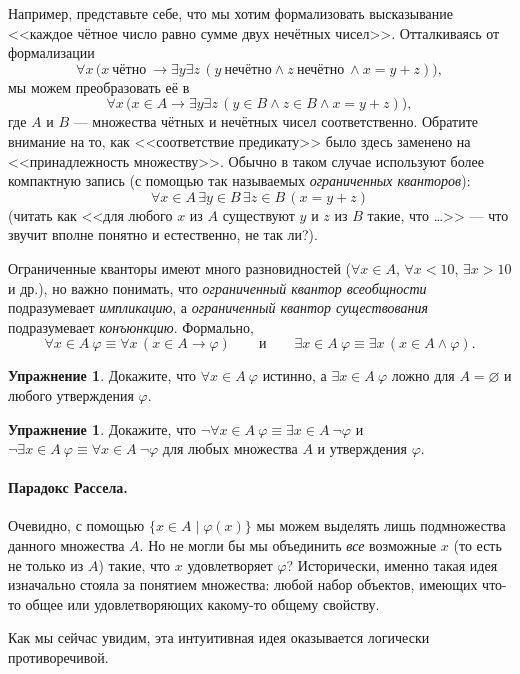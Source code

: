 \documentclass[12pt,notitlepage]{article}
\theoremstyle{plain}
\theoremstyle{definition}
\newtheorem{exc}[thm]{Упражнение}
\theoremstyle{plain}
\newcommand{\void}{\varnothing}
\renewcommand{\phi}{\varphi}
\newcommand{\1}{\mathbf{1}}
\newcommand{\0}{\mathbf{0}}
\begin{document}
Например, представьте себе, что мы хотим формализовать высказывание <<каждое чётное число равно сумме двух нечётных чисел>>. Отталкиваясь от формализации $$\forall x\, \bigl(x\ \mbox{чётно}\ \to \exists y \exists z\, (y\ \mbox{нечётно} \wedge z\ \mbox{нечётно}\ \wedge x = y + z)\bigr),$$
мы можем преобразовать её в
$$\forall x\, \bigl(x \in A \to \exists y \exists z\, (y \in B \wedge z \in B \wedge x = y + z)\bigr),$$
где $A$ и $B$ --- множества чётных и нечётных чисел соответственно. Обратите внимание на то, как <<соответствие предикату>> было здесь заменено на <<принадлежность множеству>>. Обычно в таком случае используют более компактную запись (с помощью так называемых \emph{ограниченных кванторов}):
$$\forall x \in A\, \exists y \in B\,  \exists z \in B\, (x = y + z)$$
(читать как <<для любого $x$ из $A$ существуют $y$ и $z$ из $B$ такие, что \dots>> --- что звучит вполне понятно и естественно, не так ли?).

Ограниченные кванторы имеют много разновидностей ($\forall x \in A$, $\forall x < 10$, $\exists x > 10$ и др.), но важно понимать, что \emph{ограниченный квантор всеобщности} подразумевает \emph{импликацию}, а \emph{ограниченный квантор существования} подразумевает \emph{конъюнкцию}. Формально,
$$\forall x \in A\ \phi \equiv \forall x\, (x \in A \to \phi)\qquad\mbox{и}\qquad\exists x \in A\ \phi \equiv \exists x\, (x \in A \wedge \phi).$$
\begin{exc}
	Докажите, что $\forall x \in A\ \phi$ истинно, а $\exists x \in A\ \phi$ ложно для $A = \void$ и любого утверждения $\phi$.
\end{exc}
\begin{exc}
	Докажите, что $\neg\forall x \in A\ \phi \equiv \exists x\in A\ \neg\phi$ и $\neg\exists x \in A\ \phi \equiv \forall x\in A\ \neg\phi$ для любых множества $A$ и утверждения $\phi$.
\end{exc}

\paragraph{Парадокс Рассела.} Очевидно, с помощью $\{x \in A \mid \phi(x) \}$ мы можем выделять лишь подмножества данного множества $A$. Но не могли бы мы объединить \emph{все} возможные $x$ (то есть не только из $A$) такие, что $x$ удовлетворяет $\phi$? Исторически, именно такая идея изначально стояла за понятием множества: любой набор объектов, имеющих что-то общее или удовлетворяющих какому-то общему свойству.

Как мы сейчас увидим, эта интуитивная идея оказывается логически противоречивой.
\end{document}
